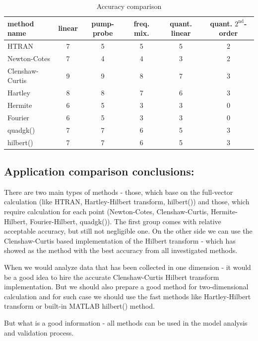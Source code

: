 \documentclass[12pt,twoside,a4paper]{article}
\numberwithin{equation}{subsection}
\numberwithin{figure}{subsection}
\begin{document}
\begin{table}
  \caption{Accuracy comparison} \label{gencom_accuracy} 
  \begin{tabular}{l | c | c | c | c | c}
    method name  &  linear  &  pump-probe  &  freq. mix.  &  quant. linear  &  quant. $2^{\text{nd}}$-order \\
    \hline
    HTRAN            &  7  &  5  &  5  &  5  &  2  \\
    Newton-Cotes     &  7  &  4  &  4  &  3  &  2  \\
    Clenshaw-Curtis  &  9  &  9  &  8  &  7  &  3  \\
    Hartley          &  8  &  8  &  7  &  6  &  3  \\
    Hermite          &  6  &  5  &  3  &  3  &  0  \\
    Fourier          &  6  &  5  &  3  &  3  &  0  \\
    quadgk()         &  7  &  7  &  6  &  5  &  3  \\
    hilbert()        &  7  &  7  &  6  &  5  &  3  \\
    \hline
  \end{tabular}
\end{table}


\subsection{Application comparison conclusions:} \label{chap:gencom_application}


There are two main types of methods - those, which base on the full-vector calculation (like HTRAN, Hartley-Hilbert
transform, hilbert()) and those, which require calculation for each point (Newton-Cotes, Clenshaw-Curtis, Hermite-Hilbert,
Fourier-Hilbert, quadgk()). The first group comes with relative acceptable accuracy, but still not negligible one. On the other
side we can use the Clenshaw-Curtis based implementation of the Hilbert transform - which has showed as the method with the
best accuracy from all investigated methods.

When we would analyze data that has been collected in one dimension - it would be a good idea to hire the accurate Clenshaw-Curtis Hilbert
transform implementation. But we should also prepare a good method for two-dimensional calculation and for such case we should use the fast
methods like Hartley-Hilbert transform or built-in MATLAB \textregistered hilbert() method.

But what is a good information - all methods can be used in the model analysis and validation process.
\end{document}
